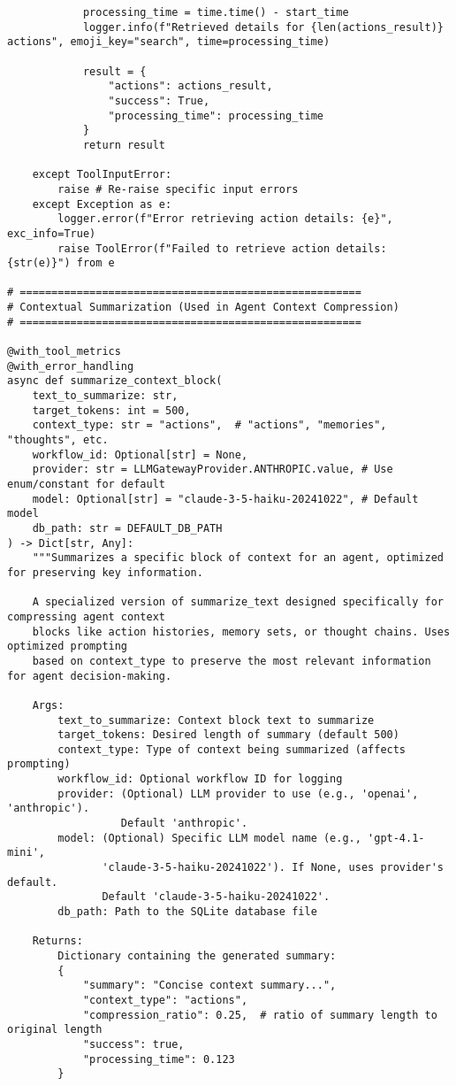 \documentclass[12pt,a4paper]{article}
\begin{document}
\begin{pageablecode}
\begin{verbatim}
            processing_time = time.time() - start_time
            logger.info(f"Retrieved details for {len(actions_result)} actions", emoji_key="search", time=processing_time)

            result = {
                "actions": actions_result,
                "success": True,
                "processing_time": processing_time
            }
            return result

    except ToolInputError:
        raise # Re-raise specific input errors
    except Exception as e:
        logger.error(f"Error retrieving action details: {e}", exc_info=True)
        raise ToolError(f"Failed to retrieve action details: {str(e)}") from e

# ======================================================
# Contextual Summarization (Used in Agent Context Compression)
# ======================================================

@with_tool_metrics
@with_error_handling
async def summarize_context_block(
    text_to_summarize: str,
    target_tokens: int = 500,
    context_type: str = "actions",  # "actions", "memories", "thoughts", etc.
    workflow_id: Optional[str] = None,
    provider: str = LLMGatewayProvider.ANTHROPIC.value, # Use enum/constant for default
    model: Optional[str] = "claude-3-5-haiku-20241022", # Default model
    db_path: str = DEFAULT_DB_PATH
) -> Dict[str, Any]:
    """Summarizes a specific block of context for an agent, optimized for preserving key information.

    A specialized version of summarize_text designed specifically for compressing agent context
    blocks like action histories, memory sets, or thought chains. Uses optimized prompting
    based on context_type to preserve the most relevant information for agent decision-making.

    Args:
        text_to_summarize: Context block text to summarize
        target_tokens: Desired length of summary (default 500)
        context_type: Type of context being summarized (affects prompting)
        workflow_id: Optional workflow ID for logging
        provider: (Optional) LLM provider to use (e.g., 'openai', 'anthropic').
                  Default 'anthropic'.
        model: (Optional) Specific LLM model name (e.g., 'gpt-4.1-mini',
               'claude-3-5-haiku-20241022'). If None, uses provider's default.
               Default 'claude-3-5-haiku-20241022'.
        db_path: Path to the SQLite database file

    Returns:
        Dictionary containing the generated summary:
        {
            "summary": "Concise context summary...",
            "context_type": "actions",
            "compression_ratio": 0.25,  # ratio of summary length to original length
            "success": true,
            "processing_time": 0.123
        }


\end{verbatim}
\end{pageablecode}
\end{document}
